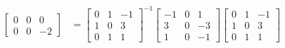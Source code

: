 \documentclass{math}
\begin{document}
\begin{align*}
\begin{bmatrix}
    0 & 0 & 0 \\
    0 & 0 & -2
  \end{bmatrix} &= \begin{bmatrix}
    0 & 1 & -1 \\
    1 & 0 & 3 \\
    0 & 1 & 1
  \end{bmatrix}^{-1}\begin{bmatrix}
    -1 & 0 & 1 \\
    3 & 0 & -3 \\
    1 & 0 & -1
  \end{bmatrix}\begin{bmatrix}
    0 & 1 & -1 \\
    1 & 0 & 3 \\
    0 & 1 & 1
  \end{bmatrix}
\end{align*}
\end{document}
